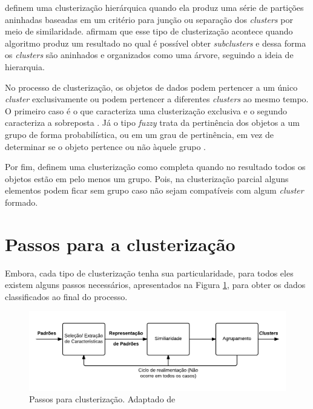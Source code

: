  definem uma clusterização hierárquica quando ela produz uma série
de partições aninhadas baseadas em um critério para junção ou separação dos \textit{clusters} por meio de similaridade. 
 afirmam que esse tipo de clusterização acontece quando algoritmo
produz um resultado no qual é possível obter \textit{subclusters} e dessa forma os \textit{clusters} são aninhados
e organizados como uma árvore, seguindo a ideia de hierarquia.

No processo de clusterização, os objetos de dados podem pertencer a um único \textit{cluster} exclusivamente ou podem
pertencer a diferentes \textit{clusters} ao mesmo tempo. O primeiro caso é o que caracteriza uma clusterização exclusiva e o segundo caracteriza a sobreposta \cite{tan2013data}. 
Já o tipo \textit{fuzzy} trata da pertinência dos objetos a um grupo de forma probabilística, 
ou em um grau de pertinência, em vez de determinar se o objeto pertence ou não àquele grupo \cite{tan2013data, clustering_review}.

Por fim,  definem uma clusterização como completa quando no resultado todos os objetos estão em pelo menos um grupo. 
Pois, na clusterização parcial alguns elementos podem ficar sem grupo caso não sejam compatíveis com algum \textit{cluster} formado.

\section{Passos para a clusterização}

Embora, cada tipo de clusterização tenha sua particularidade, para todos eles existem alguns passos necessários, apresentados na Figura \ref{fig:tasks_clustering}, 
para obter os dados classificados ao final do processo.

\begin{figure}[h!]
\centering
\includegraphics[scale=0.5]{figuras/tasks_clustering.png}
\caption{Passos para clusterização. Adaptado de }
\label{fig:tasks_clustering}
\end{figure}

